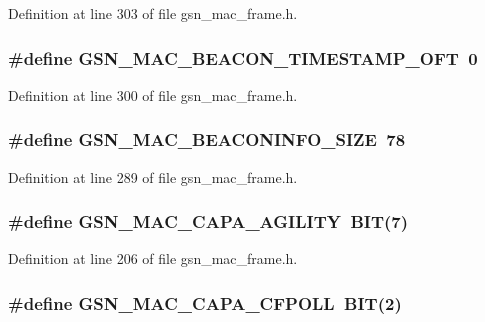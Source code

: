 Definition at line 303 of file gsn\_\-mac\_\-frame.h.

\hypertarget{a00523_a85dce590f6356a0a0440aa9ec83522ac}{
\subsubsection[{GSN\_\-MAC\_\-BEACON\_\-TIMESTAMP\_\-OFT}]{\setlength{\rightskip}{0pt plus 5cm}\#define GSN\_\-MAC\_\-BEACON\_\-TIMESTAMP\_\-OFT~0}}
\label{a00523_a85dce590f6356a0a0440aa9ec83522ac}


Definition at line 300 of file gsn\_\-mac\_\-frame.h.

\hypertarget{a00523_ae92a862e245b3cc55c49100817a37a4e}{
\subsubsection[{GSN\_\-MAC\_\-BEACONINFO\_\-SIZE}]{\setlength{\rightskip}{0pt plus 5cm}\#define GSN\_\-MAC\_\-BEACONINFO\_\-SIZE~78}}
\label{a00523_ae92a862e245b3cc55c49100817a37a4e}


Definition at line 289 of file gsn\_\-mac\_\-frame.h.

\hypertarget{a00523_ac104dc806c321c567742b1acf84e4154}{
\subsubsection[{GSN\_\-MAC\_\-CAPA\_\-AGILITY}]{\setlength{\rightskip}{0pt plus 5cm}\#define GSN\_\-MAC\_\-CAPA\_\-AGILITY~BIT(7)}}
\label{a00523_ac104dc806c321c567742b1acf84e4154}


Definition at line 206 of file gsn\_\-mac\_\-frame.h.

\hypertarget{a00523_a739b2c5021ef3f7666dbdef3d5329298}{
\subsubsection[{GSN\_\-MAC\_\-CAPA\_\-CFPOLL}]{\setlength{\rightskip}{0pt plus 5cm}\#define GSN\_\-MAC\_\-CAPA\_\-CFPOLL~BIT(2)}}
\label{a00523_a739b2c5021ef3f7666dbdef3d5329298}


